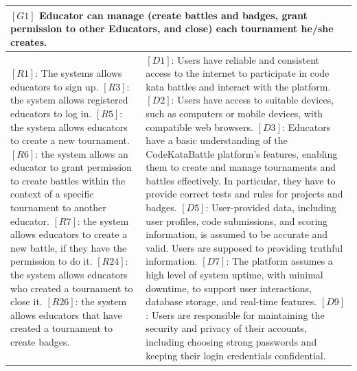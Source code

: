 \begin{table}[H]
    \centering
    \begin{tabular}{|p{8cm}|p{8cm}|}
      \hline
      \multicolumn{2}{|p{16cm}|}{\textbf{$[G1]$ Educator can manage (create battles and badges, grant permission to other Educators, and close) each tournament he/she creates. }} \\
      \hline
      {$[R1]$: The systems allows educators to sign up.
      \newline$[R3]$: the system allows registered educators to log in.
      \newline$[R5]$: the system allows educators to create a new tournament.
      \newline$[R6]$: the system allows an educator to grant permission to create battles within the context of a specific tournament to another educator.
      \newline$[R7]$: the system allows educators to create a new battle, if they have the permission to do it.
      \newline$[R24]$: the system allows educators who created a tournament to close it.
      \newline$[R26]$: the system allows educators that have created a tournament to create badges.}
      & 
      {$[D1]$: Users have reliable and consistent access to the internet to participate in code kata battles and interact with the platform.
      \newline$[D2]$: Users have access to suitable devices, such as computers or mobile devices, with compatible web browsers.
      \newline$[D3]$: Educators have a basic understanding of the CodeKataBattle platform's features, enabling them to create and manage tournaments and battles effectively. In particular, they have to provide correct tests and rules for projects and badges.
      \newline$[D5]$: User-provided data, including user profiles, code submissions, and scoring information, is assumed to be accurate and valid. Users are supposed to providing truthful information.
      \newline$[D7]$: The platform assumes a high level of system uptime, with minimal downtime, to support user interactions, database storage, and real-time features.
      \newline$[D9]$: Users are responsible for maintaining the security and privacy of their accounts, including choosing strong passwords and keeping their login credentials confidential.}
      \\
      \hline
    \end{tabular}
\end{table}

